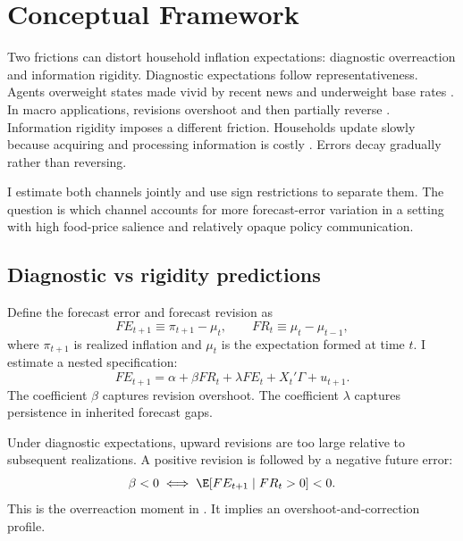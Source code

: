\section{Conceptual Framework}\label{sec:literature}

Two frictions can distort household inflation expectations: diagnostic
overreaction and information rigidity. Diagnostic expectations follow
representativeness. Agents overweight states made vivid by recent news and
underweight base rates \citep{Kahneman1972, Gennaioli2010}. In macro
applications, revisions overshoot and then partially reverse
\citep{Bordalo2018, Bordalo2020b}. Information rigidity imposes a different
friction. Households update slowly because acquiring and processing information
is costly \citep{Sims2003, Coibion2015}. Errors decay gradually rather than
reversing.

I estimate both channels jointly and use sign restrictions to separate them.
The question is which channel accounts for more forecast-error variation in a
setting with high food-price salience and relatively opaque policy
communication.

\subsection{Diagnostic vs rigidity predictions}\label{sec:diagnostic_vs_rigidity}

Define the forecast error and forecast revision as
\begin{equation*}
  FE_{t+1} \equiv \pi_{t+1} - \mu_t, \qquad FR_t \equiv \mu_t - \mu_{t-1},
\end{equation*}
where $\pi_{t+1}$ is realized inflation and $\mu_t$ is the expectation formed
at time $t$. I estimate a nested specification:
\begin{equation*}
  FE_{t+1} = \alpha + \beta FR_t + \lambda FE_t + X_t'\Gamma + u_{t+1}.
\end{equation*}
The coefficient $\beta$ captures revision overshoot. The coefficient $\lambda$
captures persistence in inherited forecast gaps.

Under diagnostic expectations, upward revisions are too large relative to
subsequent realizations. A positive revision is followed by a negative future
error:
\begin{equation}\label{eq:diagnostic_prediction}
  \beta < 0 \;\Longleftrightarrow\; \E[FE_{t+1}\mid FR_t>0] < 0.
\end{equation}
This is the overreaction moment in \citet{Bordalo2020b}. It implies an
overshoot-and-correction profile.

